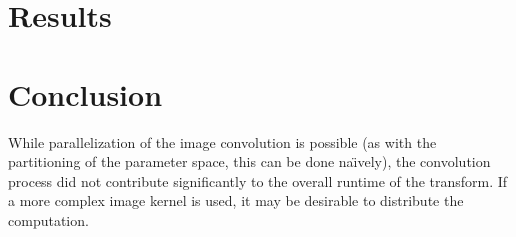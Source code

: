 \documentclass[letterpaper,12pt,titlepage]{article}
\begin{document}
\section{Results}

\section{Conclusion}
While parallelization of the image convolution is possible (as with the partitioning of the parameter space,
this can be done na\"{\i}vely), the convolution process did not contribute significantly to the overall
runtime of the transform. If a more complex image kernel is used, it may be desirable to distribute the
computation.

\newpage

\end{document}
